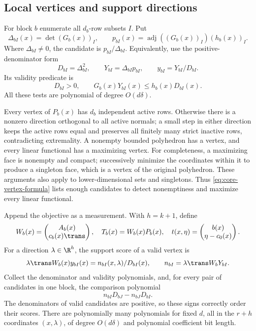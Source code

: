 \subsection{Local vertices and support directions}\label{app:local-support}

For block $b$ enumerate all $d_b$-row subsets $I$. Put
\[
 \Delta_{bI}(x)=\det (G_b(x))_I,\qquad
 p_{bI}(x)=\operatorname{adj}((G_b(x))_I)(h_b(x))_I.
\]
Where $\Delta_{bI}\ne0$, the candidate is
$p_{bI}/\Delta_{bI}$. Equivalently, use the positive-denominator form
\begin{equation}\label{eq:core-vertex-formula}
 D_{bI}=\Delta_{bI}^2,\qquad Y_{bI}=\Delta_{bI}p_{bI},\qquad
                          y_{bI}=Y_{bI}/D_{bI}.
\end{equation}
Its validity predicate is
\begin{equation}\label{eq:core-vertex-validity}
 D_{bI}>0,\qquad G_b(x)Y_{bI}(x)\le h_b(x)D_{bI}(x).
\end{equation}
All these tests are polynomial of degree $O(d\delta)$.

Every vertex of $P_b(x)$ has $d_b$ independent active rows. Otherwise
there is a nonzero direction orthogonal to all active normals; a small
step in either direction keeps the active rows equal and preserves all
finitely many strict inactive rows, contradicting extremality. A
nonempty bounded polyhedron has a vertex, and every linear functional
has a maximizing vertex. For completeness, a maximizing face is nonempty
and compact; successively minimize the coordinates within it to produce
a singleton face, which is a vertex of the original polyhedron.
These arguments also apply to lower-dimensional sets and singletons.
Thus \eqref{eq:core-vertex-formula} lists enough candidates to detect
nonemptiness and maximize every linear functional.

Append the objective as a measurement. With $h=k+1$, define
\begin{equation}\label{eq:core-images}
 W_b(x)=\begin{pmatrix}A_b(x)\\c_b(x)\trans\end{pmatrix},\quad
 T_b(x)=W_b(x)P_b(x),\quad
 t(x,\eta)=\begin{pmatrix}b(x)\\\eta-c_0(x)\end{pmatrix}.
\end{equation}
For a direction $\lambda\in\R^h$, the support score of a valid
vertex is
\[
 \lambda\trans W_b(x)y_{bI}(x)=n_{bI}(x,\lambda)/D_{bI}(x),\qquad
 n_{bI}=\lambda\trans W_bY_{bI}.
\]
Collect the denominator and validity polynomials, and, for every pair
of candidates in one block, the comparison polynomial
\begin{equation}\label{eq:core-score-comparison}
                     n_{bI}D_{bJ}-n_{bJ}D_{bI}.
\end{equation}
The denominators of valid candidates are positive, so these signs
correctly order their scores. There are polynomially many polynomials
for fixed $d$, all in the $r+h$ coordinates $(x,\lambda)$, of degree
$O(d\delta)$ and polynomial coefficient bit length.

